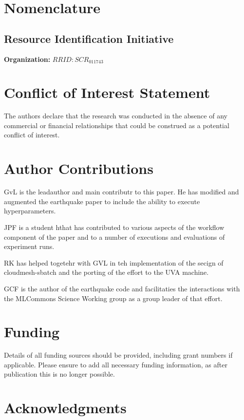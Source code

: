 \documentclass[utf8]{FrontiersinVancouver} %
\begin{document}
\section{Nomenclature}

\subsection{Resource Identification Initiative}

{\bf Organization:} $RRID:SCR_011743$

\section*{Conflict of Interest Statement}

The authors declare that the research was conducted in the absence of
any commercial or financial relationships that could be construed as a
potential conflict of interest.

\section*{Author Contributions}

GvL is the leadauthor and main contributr to this paper. He has
modified and augmented the earthquake paper to include the ability to
execute hyperparameters. 

JPF is a student hthat has contributed to various aspects of the
workflow component of the paper and to a number of executions and
evaluations of experiment runs.

RK has helped togetehr with GVL in teh implementation of the secign of
cloudmesh-sbatch and the porting of the effort to the UVA machine.

GCF is the author of the earthquake code and facilitaties the
interactions with the MLCommons Science Working group as a group
leader of that effort.

\section*{Funding}

Details of all funding sources should be provided, including grant
numbers if applicable. Please ensure to add all necessary funding
information, as after publication this is no longer possible.

\section*{Acknowledgments}
\end{document}
